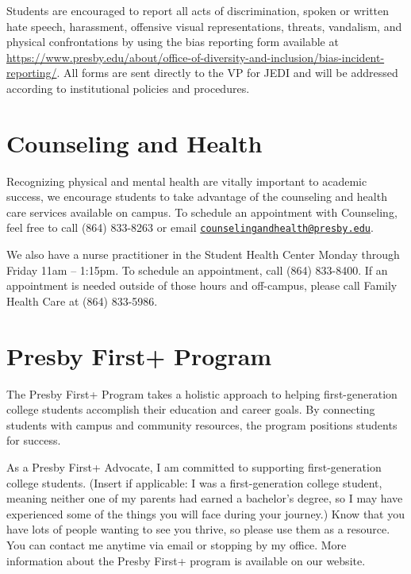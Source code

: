\documentclass[
]{book}
\begin{document}
Students are encouraged to report all acts of discrimination, spoken or written hate speech, harassment, offensive visual representations, threats, vandalism, and physical confrontations by using the bias reporting form available at \url{https://www.presby.edu/about/office-of-diversity-and-inclusion/bias-incident-reporting/}. All forms are sent directly to the VP for JEDI and will be addressed according to institutional policies and procedures.

\hypertarget{counseling-and-health}{%
\section{Counseling and Health}\label{counseling-and-health}}

Recognizing physical and mental health are vitally important to academic success, we encourage students to take advantage of the counseling and health care services available on campus. To schedule an appointment with Counseling, feel free to call (864) 833-8263 or email \href{mailto:counselingandhealth@presby.edu}{\nolinkurl{counselingandhealth@presby.edu}}.

We also have a nurse practitioner in the Student Health Center Monday through Friday 11am -- 1:15pm. To schedule an appointment, call (864) 833-8400. If an appointment is needed outside of those hours and off-campus, please call Family Health Care at (864) 833-5986.

\hypertarget{presby-first-program}{%
\section{Presby First+ Program}\label{presby-first-program}}

The Presby First+ Program takes a holistic approach to helping first-generation college students accomplish their education and career goals. By connecting students with campus and community resources, the program positions students for success.

As a Presby First+ Advocate, I am committed to supporting first-generation college students. (Insert if applicable: I was a first-generation college student, meaning neither one of my parents had earned a bachelor's degree, so I may have experienced some of the things you will face during your journey.) Know that you have lots of people wanting to see you thrive, so please use them as a resource. You can contact me anytime via email or stopping by my office. More information about the Presby First+ program is available on our website.
\end{document}
